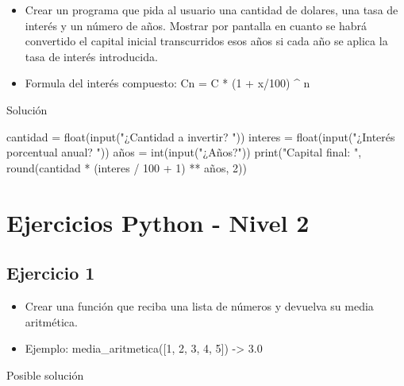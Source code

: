 \documentclass[
  a4paper,
  DIV=11,
  numbers=noendperiod,
  onepage,
  openany]{scrreprt}
\newenvironment{Shaded}{\begin{snugshade}}{\end{snugshade}}
\newcommand{\BuiltInTok}[1]{\textcolor[rgb]{0.00,0.23,0.31}{#1}}
\newcommand{\DecValTok}[1]{\textcolor[rgb]{0.68,0.00,0.00}{#1}}
\newcommand{\NormalTok}[1]{\textcolor[rgb]{0.00,0.23,0.31}{#1}}
\newcommand{\OperatorTok}[1]{\textcolor[rgb]{0.37,0.37,0.37}{#1}}
\newcommand{\StringTok}[1]{\textcolor[rgb]{0.13,0.47,0.30}{#1}}
\providecommand{\tightlist}{%
  \setlength{\itemsep}{0pt}\setlength{\parskip}{0pt}}\usepackage{longtable,booktabs,array}
\begin{document}
\begin{tcolorbox}
\begin{itemize}
\tightlist
\item
  Crear un programa que pida al usuario una cantidad de dolares, una
  tasa de interés y un número de años. Mostrar por pantalla en cuanto se
  habrá convertido el capital inicial transcurridos esos años si cada
  año se aplica la tasa de interés introducida.
\item
  Formula del interés compuesto: Cn = C * (1 + x/100) \^{} n
\end{itemize}

Solución

\begin{Shaded}
\begin{Highlighting}[]
\NormalTok{cantidad }\OperatorTok{=} \BuiltInTok{float}\NormalTok{(}\BuiltInTok{input}\NormalTok{(}\StringTok{"¿Cantidad a invertir? "}\NormalTok{))}
\NormalTok{interes }\OperatorTok{=} \BuiltInTok{float}\NormalTok{(}\BuiltInTok{input}\NormalTok{(}\StringTok{"¿Interés porcentual anual? "}\NormalTok{))}
\NormalTok{años }\OperatorTok{=} \BuiltInTok{int}\NormalTok{(}\BuiltInTok{input}\NormalTok{(}\StringTok{"¿Años?"}\NormalTok{))}
\BuiltInTok{print}\NormalTok{(}\StringTok{"Capital final: "}\NormalTok{, }\BuiltInTok{round}\NormalTok{(cantidad }\OperatorTok{*}\NormalTok{ (interes }\OperatorTok{/} \DecValTok{100} \OperatorTok{+} \DecValTok{1}\NormalTok{) }\OperatorTok{**}\NormalTok{ años, }\DecValTok{2}\NormalTok{))}
\end{Highlighting}
\end{Shaded}

\chapter{Ejercicios Python - Nivel 2}\label{ejercicios-python---nivel-2}

\section{Ejercicio 1}\label{ejercicio-1-3}

\begin{itemize}
\tightlist
\item
  Crear una función que reciba una lista de números y devuelva su media
  aritmética.
\item
  Ejemplo: media\_aritmetica({[}1, 2, 3, 4, 5{]}) -\textgreater{} 3.0
\end{itemize}

Posible solución


\end{tcolorbox}
\end{document}
